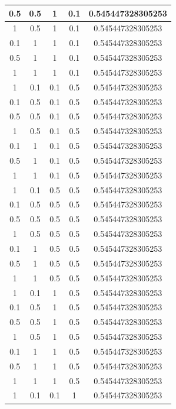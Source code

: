 \begin{table}[htbp]
{\begin{minipage}{\textwidth}
\begin{tabular}{||c c c c c||}
				0.5 & 0.5 & 1 & 0.1 & 0.545447328305253 \\ 
				\hline
				1 & 0.5 & 1 & 0.1 & 0.545447328305253 \\ 
				\hline
				0.1 & 1 & 1 & 0.1 & 0.545447328305253 \\ 
				\hline
				0.5 & 1 & 1 & 0.1 & 0.545447328305253 \\ 
				\hline
				1 & 1 & 1 & 0.1 & 0.545447328305253 \\ 
				\hline
				1 & 0.1 & 0.1 & 0.5 & 0.545447328305253 \\ 
				\hline
				0.1 & 0.5 & 0.1 & 0.5 & 0.545447328305253 \\ 
				\hline
				0.5 & 0.5 & 0.1 & 0.5 & 0.545447328305253 \\ 
				\hline
				1 & 0.5 & 0.1 & 0.5 & 0.545447328305253 \\ 
				\hline
				0.1 & 1 & 0.1 & 0.5 & 0.545447328305253 \\ 
				\hline
				0.5 & 1 & 0.1 & 0.5 & 0.545447328305253 \\ 
				\hline
				1 & 1 & 0.1 & 0.5 & 0.545447328305253 \\ 
				\hline
				1 & 0.1 & 0.5 & 0.5 & 0.545447328305253 \\ 
				\hline
				0.1 & 0.5 & 0.5 & 0.5 & 0.545447328305253 \\ 
				\hline
				0.5 & 0.5 & 0.5 & 0.5 & 0.545447328305253 \\ 
				\hline
				1 & 0.5 & 0.5 & 0.5 & 0.545447328305253 \\ 
				\hline
				0.1 & 1 & 0.5 & 0.5 & 0.545447328305253 \\ 
				\hline
				0.5 & 1 & 0.5 & 0.5 & 0.545447328305253 \\ 
				\hline
				1 & 1 & 0.5 & 0.5 & 0.545447328305253 \\ 
				\hline
				1 & 0.1 & 1 & 0.5 & 0.545447328305253 \\ 
				\hline
				0.1 & 0.5 & 1 & 0.5 & 0.545447328305253 \\ 
				\hline
				0.5 & 0.5 & 1 & 0.5 & 0.545447328305253 \\ 
				\hline
				1 & 0.5 & 1 & 0.5 & 0.545447328305253 \\ 
				\hline
				0.1 & 1 & 1 & 0.5 & 0.545447328305253 \\ 
				\hline
				0.5 & 1 & 1 & 0.5 & 0.545447328305253 \\ 
				\hline
				1 & 1 & 1 & 0.5 & 0.545447328305253 \\ 
				\hline
				1 & 0.1 & 0.1 & 1 & 0.545447328305253 \\ 

\end{tabular}
\end{minipage}}
\end{table}
